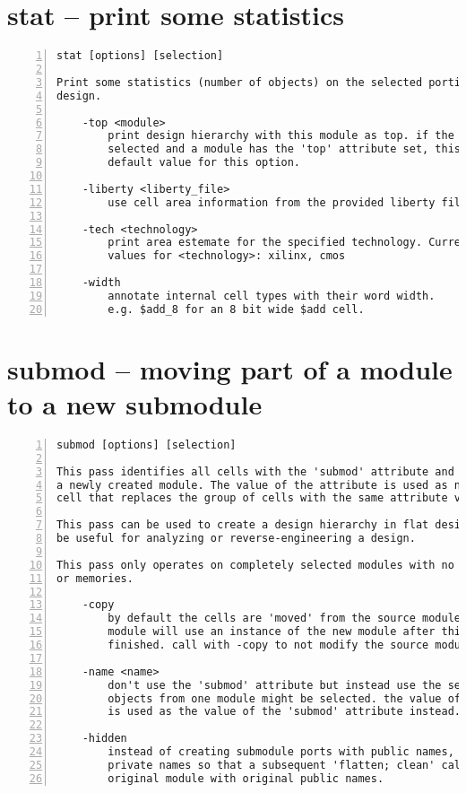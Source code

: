 \section{stat -- print some statistics}
\label{cmd:stat}
\begin{lstlisting}[numbers=left,frame=single]
    stat [options] [selection]

Print some statistics (number of objects) on the selected portion of the
design.

    -top <module>
        print design hierarchy with this module as top. if the design is fully
        selected and a module has the 'top' attribute set, this module is used
        default value for this option.

    -liberty <liberty_file>
        use cell area information from the provided liberty file

    -tech <technology>
        print area estemate for the specified technology. Currently supported
        values for <technology>: xilinx, cmos

    -width
        annotate internal cell types with their word width.
        e.g. $add_8 for an 8 bit wide $add cell.
\end{lstlisting}

\section{submod -- moving part of a module to a new submodule}
\label{cmd:submod}
\begin{lstlisting}[numbers=left,frame=single]
    submod [options] [selection]

This pass identifies all cells with the 'submod' attribute and moves them to
a newly created module. The value of the attribute is used as name for the
cell that replaces the group of cells with the same attribute value.

This pass can be used to create a design hierarchy in flat design. This can
be useful for analyzing or reverse-engineering a design.

This pass only operates on completely selected modules with no processes
or memories.

    -copy
        by default the cells are 'moved' from the source module and the source
        module will use an instance of the new module after this command is
        finished. call with -copy to not modify the source module.

    -name <name>
        don't use the 'submod' attribute but instead use the selection. only
        objects from one module might be selected. the value of the -name option
        is used as the value of the 'submod' attribute instead.

    -hidden
        instead of creating submodule ports with public names, create ports with
        private names so that a subsequent 'flatten; clean' call will restore the
        original module with original public names.
\end{lstlisting}


